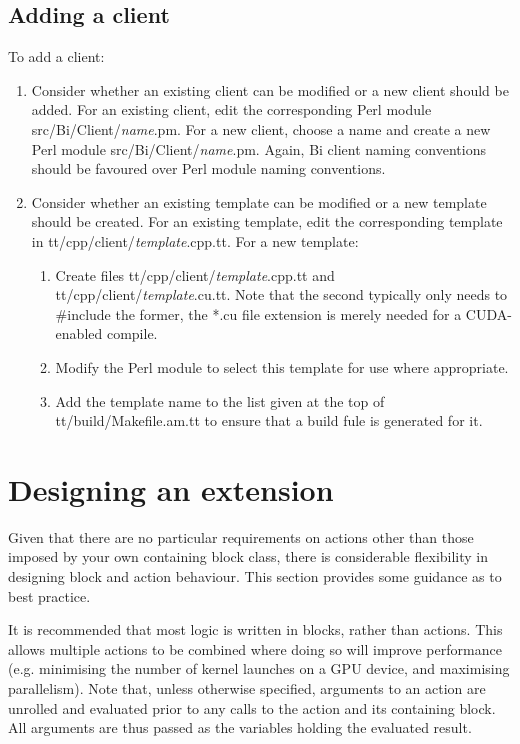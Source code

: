 \subsection{Adding a client\label{Adding_a_client}}

To add a client:
\begin{enumerate}
\item Consider whether an existing client can be modified or a new client
  should be added. For an existing client, edit the corresponding Perl module
  \textsf{src/Bi/Client/\textit{name}.pm}. For a new client, choose a name
  and create a new Perl module \textsf{src/Bi/Client/\textit{name}.pm}. Again,
  Bi client naming conventions should be favoured over Perl module naming
  conventions.
\item Consider whether an existing template can be modified or a new template
  should be created. For an existing template, edit the corresponding template
  in \textsf{tt/cpp/client/\textit{template}.cpp.tt}. For a new template:
\begin{enumerate}
\item Create files \textsf{tt/cpp/client/\textit{template}.cpp.tt} and
  \textsf{tt/cpp/client/\textit{template}.cu.tt}. Note that the second
  typically only needs to \textsf{\#include} the former, the \textsf{*.cu}
  file extension is merely needed for a CUDA-enabled compile.
\item Modify the Perl module to select this template for use where
  appropriate.
\item Add the template name to the list given at the top of
  \textsf{tt/build/Makefile.am.tt} to ensure that a build fule is generated
  for it.
\end{enumerate}
\end{enumerate}

\section{Designing an extension\label{Designing_an_extension}}

Given that there are no particular requirements on actions other than those
imposed by your own containing block class, there is considerable flexibility
in designing block and action behaviour. This section provides some guidance
as to best practice.

It is recommended that most logic is written in blocks, rather than
actions. This allows multiple actions to be combined where doing so will
improve performance (e.g. minimising the number of kernel launches on a GPU
device, and maximising parallelism). Note that, unless otherwise specified,
arguments to an action are unrolled and evaluated prior to any calls to the
action and its containing block. All arguments are thus passed as the
variables holding the evaluated result.

